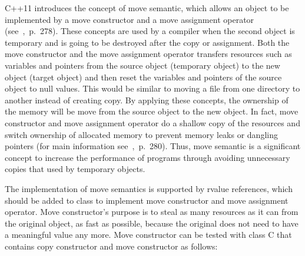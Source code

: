 \documentclass[11pt]{report}
\begin{document}
C++11 introduces the concept of move semantic, which allows an object to be implemented by a move constructor and a move assignment operator (see~\cite{Gregorie:professionalcpp},~p.~278). These concepts are used by a compiler when the second object is temporary and is going to be destroyed after the copy or assignment. Both the move constructor and the move assignment operator transfers resources such as variables and pointers from the source object (temporary object) to the new object (target object) and then reset the variables and pointers of the source object to null values. This would be similar to moving a file from one directory to another instead of creating copy. By applying these concepts, the ownership of the memory will be move from the source object to the new object. In fact, move constructor and move assignment operator do a shallow copy of the resources and switch ownership of allocated memory to prevent memory leaks or dangling pointers (for main information see~\cite{Gregorie:professionalcpp},~p.~280). Thus, move semantic is a significant concept to increase the performance of programs through avoiding unnecessary copies that used by temporary objects.

The implementation of move semantics is supported by rvalue references, which should be added to class to implement move constructor and move assignment operator. Move constructor's purpose is to steal as many resources as it can from the original object, as fast as possible, because the original does not need to have a meaningful value any more. Move constructor can be tested with class C that contains copy constructor and move constructor as follows:
\end{document}
